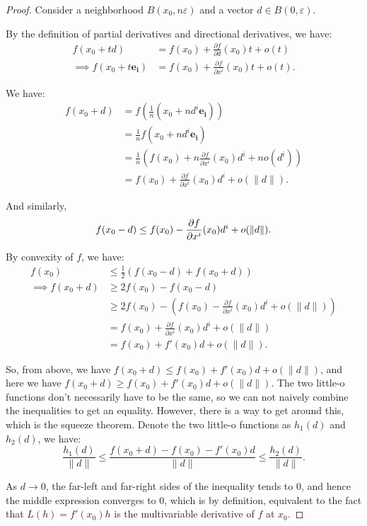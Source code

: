 \begin{proof}
  Consider a neighborhood \( B(x_{0}, n\varepsilon) \) and a vector \( d \in B(0,
  \varepsilon) \).

  By the definition of partial derivatives and directional derivatives, we have:
  \begin{align*}
    f(x_{0} + t d) &= f(x_{0}) + \frac{\partial f}{\partial d}(x_{0})t +o(t)\\
    \implies f(x_{0} + t\mathbf{e_{i}}) &= f(x_{0}) + \frac{\partial f}{\partial
    x^{i}}(x_{0}) t + o(t)
  .\end{align*}

  We have:
  \begin{align*}
  f(x_{0} + d) &= f \left( \frac{1}{n}(x_{0} + nd^{i}\mathbf{e_{i}}) \right) \\
  &= \frac{1}{n}f(x_{0} + nd^{i}\mathbf{e_{i}}) \\
  &= \frac{1}{n} \left( f(x_{0}) + n\frac{\partial f}{\partial x^{i}}(x_{0})d^{i} +
  no(d^{i}) \right)  \\
  &= f(x_{0}) + \frac{\partial f}{\partial x^{i}}(x_{0}) d^{i} + o(\|d\|)
  .\end{align*}

  And similarly,
  \[
    f(x_{0} - d) \le  f(x_{0}) - \frac{\partial f}{\partial x^{i}}(x_{0})d^{i} +
    o(\|d\|) \\
  .\] 

  By convexity of \( f \), we have:
  \begin{align*}
    f(x_{0}) &\le \frac{1}{2} \left( f(x_{0} - d) + f(x_{0} + d) \right) \\
    \implies f(x_{0} + d) &\ge 2f(x_{0}) - f(x_{0} - d) \\
                          &\ge 2f(x_{0}) - \left( f(x_{0}) - \frac{\partial f}{\partial x^{i}}(x_{0})d^{i} +
    o(\|d\|) \right) \\
    &= f(x_{0}) + \frac{\partial f}{\partial x^{i}}(x_{0})d^{i} +
    o(\|d\|)\\
    &= f(x_{0}) + f'(x_{0})d + o(\|d\|)
  .\end{align*}

  So, from above, we have \( f(x_{0} + d) \le f(x_{0}) + f'(x_{0})d + o(\|d\|)
  \), and here we have \( f(x_{0} + d) \ge f(x_{0}) + f'(x_{0})d + o(\|d\|) \).
  The two little-o functions don't necessarily have to be the same, so we can
  not naively combine the inequalities to get an equality. However, there is a
  way to get around this, which is the squeeze theorem. Denote the two little-o
  functions as \( h_{1}(d) \) and \( h_{2}(d) \), we have:
  \[
    \frac{h_{1}(d)}{\|d\|} \le \frac{f(x_{0} + d) - f(x_{0}) -
    f'(x_{0})d}{\|d\|} \le \frac{h_{2}(d)}{\|d\|}
  .\] 

  As \( d \to 0 \), the far-left and far-right sides of the inequality tends to
  \( 0 \), and hence the middle expression converges to \( 0 \), which is by
  definition, equivalent to the fact that \( L(h) =
  f'(x_{0})h\) is the multivariable derivative of \( f \) at \( x_{0} \).
\end{proof}

